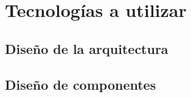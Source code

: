 \section{Tecnologías a utilizar}
\subsection{Diseño de la arquitectura}


\subsection{Diseño de componentes}

